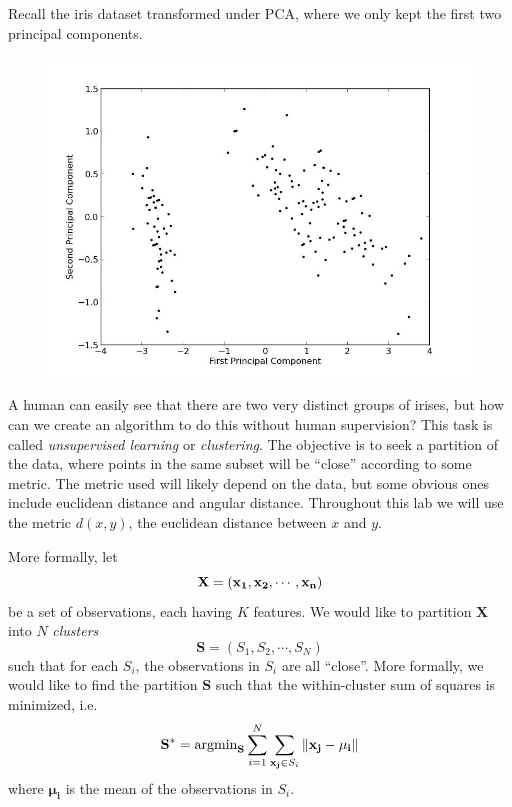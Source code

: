 
Recall the iris dataset transformed under PCA, where we only kept the first two principal components.

\begin{figure}
\centering
\includegraphics[width=\textwidth]{irispca.jpg}
\end{figure}

A human can easily see that there are two very distinct groups of irises, but how can we create an algorithm to do this without human supervision? This task is called \emph{unsupervised learning} or \emph{clustering}. The objective is to seek a partition of the data, where points in the same subset will be ``close'' according to some metric. The metric used will likely depend on the data, but some obvious ones include euclidean distance and angular distance. Throughout this lab we will use the metric $d(x,y)$, the euclidean distance between $x$ and $y$.

More formally, let 
\begin{equation*}
\mathbf{X} = \left( \mathbf{x_{1}}, \mathbf{x_{2}}, \cdots, \mathbf{{\bf x}_{n}}\right)
\end{equation*}
be a set of observations, each having $K$ features. We would like to partition $\mathbf{X}$ into $N$ \emph{clusters}
\begin{equation*}
\mathbf{S} = \left( S_{1}, S_{2}, \cdots, S_{N}\right)
\end{equation*}
such that for each $S_{i}$, the observations in $S_{i}$ are all ``close''. More formally, we would like to find the partition $\mathbf{S}$ such that the within-cluster sum of squares is minimized, i.e. 
\begin{equation*}
\mathbf{S^{*}} = \text{argmin}_{\mathbf{S}} \sum_{i=1}^{N} \sum_{\mathbf{x_{j}} \in S_{i}} \left\lVert\mathbf{x_{j}} - \mathbf{\mu_{i}}\right\rVert
\end{equation*}
where $\mathbf{\mu_{i}}$ is the mean of the observations in $S_{i}$.

